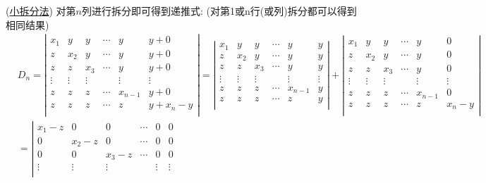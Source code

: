 \documentclass[lang=cn,newtx,10pt,scheme=chinese]{elegantbook}
\begin{document}
\begin{solution}(\hyperref[小拆分法]{小拆分法})
    对第$n$列进行拆分即可得到递推式:
    (对第1或n行(或列)拆分都可以得到相同结果)
    \begin{align}
        &D_n=\left| \begin{matrix}
            x_1&		y&		y&		\cdots&		y&		y+0\\
            z&		x_2&		y&		\cdots&		y&		y+0\\
            z&		z&		x_3&		\cdots&		y&		y+0\\
            \vdots&		\vdots&		\vdots&		&		\vdots&		\vdots\\
            z&		z&		z&		\cdots&		x_{n-1}&		y+0\\
            z&		z&		z&		\cdots&		z&		y+x_n-y\\
        \end{matrix} \right|=\left| \begin{matrix}
            x_1&		y&		y&		\cdots&		y&		y\\
            z&		x_2&		y&		\cdots&		y&		y\\
            z&		z&		x_3&		\cdots&		y&		y\\
            \vdots&		\vdots&		\vdots&		&		\vdots&		\vdots\\
            z&		z&		z&		\cdots&		x_{n-1}&		y\\
            z&		z&		z&		\cdots&		z&		y\\
        \end{matrix} \right|+\left| \begin{matrix}
            x_1&		y&		y&		\cdots&		y&		0\\
            z&		x_2&		y&		\cdots&		y&		0\\
            z&		z&		x_3&		\cdots&		y&		0\\
            \vdots&		\vdots&		\vdots&		&		\vdots&		\vdots\\
            z&		z&		z&		\cdots&		x_{n-1}&		0\\
            z&		z&		z&		\cdots&		z&		x_n-y\\
        \end{matrix} \right|
        \nonumber\\
        &=\left| \begin{matrix}
            x_1-z&		0&		0&		\cdots&		0&		0\\
            0&		x_2-z&		0&		\cdots&		0&		0\\
            0&		0&		x_3-z&		\cdots&		0&		0\\
            \vdots&		\vdots&		\vdots&		&		\vdots&		\vdots\\

\end{matrix}
\end{align}
\end{solution}
\end{document}
